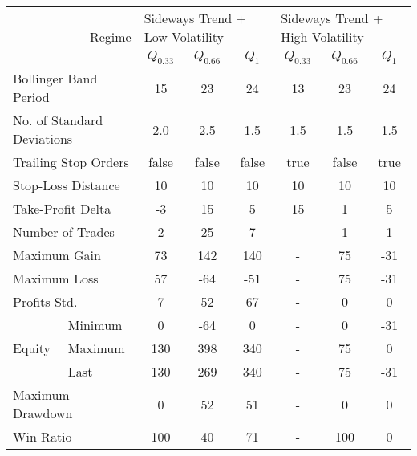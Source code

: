 \begin{tabular}{ll|cccccc}
    \toprule
    \multicolumn{2}{r|}{\multirow{2}{*}{Regime}} & \multicolumn{3}{l}{Sideways Trend + Low Volatility} & \multicolumn{3}{l}{Sideways Trend + High Volatility}  \\
    \multicolumn{2}{r|}{} & $Q_{0.33}$ & $Q_{0.66}$ & $Q_{1}$ & $Q_{0.33}$ & $Q_{0.66}$ & $Q_{1}$ \\
    \midrule
    \multicolumn{2}{l|}{Bollinger Band Period} & 15 & 23 & 24 & 13 & 23 & 24 \\
    \multicolumn{2}{l|}{No. of Standard Deviations} & 2.0 & 2.5 & 1.5 & 1.5 & 1.5 & 1.5 \\
    \multicolumn{2}{l|}{Trailing Stop Orders} & false & false & false & true & false & true \\
    \multicolumn{2}{l|}{Stop-Loss Distance} & 10 & 10 & 10 & 10 & 10 & 10 \\
    \multicolumn{2}{l|}{Take-Profit Delta} & -3 & 15 & 5 & 15 & 1 & 5 \\
    \midrule
    \multicolumn{2}{l|}{Number of Trades} & 2 & 25 & 7 & - & 1 & 1 \\
    \multicolumn{2}{l|}{Maximum Gain} & 73 & 142 & 140 & - & 75 & -31 \\
    \multicolumn{2}{l|}{Maximum Loss} & 57 & -64 & -51 & - & 75 & -31 \\
    \multicolumn{2}{l|}{Profits Std.} & 7 & 52 & 67 & - & 0 & 0 \\
    \multirow{3}{*}{Equity} & Minimum & 0   & -64 & 0   & - & 0  & -31 \\
    & Maximum & 130 & 398 & 340 & - & 75 & 0   \\
    & Last    & 130 & 269 & 340 & - & 75 & -31 \\
    \multicolumn{2}{l|}{Maximum Drawdown} & 0 & 52 & 51 & - & 0 & 0 \\
    \multicolumn{2}{l|}{Win Ratio} & 100 & 40 & 71 & - & 100 & 0 \\
    \bottomrule
\end{tabular}